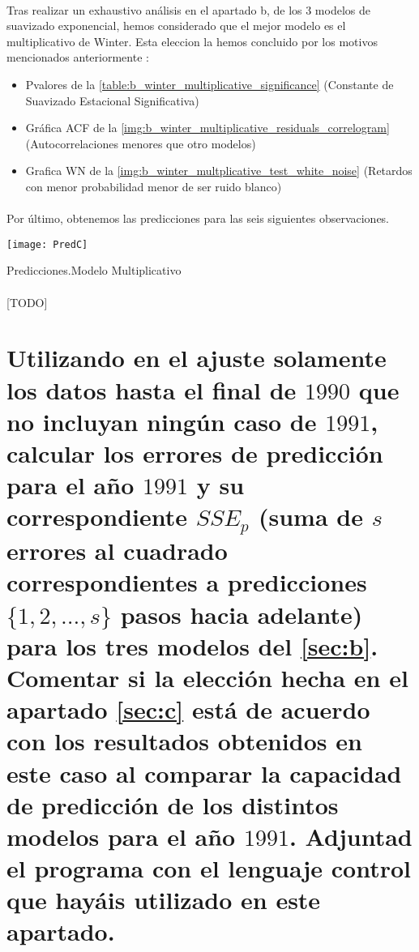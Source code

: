 \documentclass[a4paper, spanish]{article}
\begin{document}
    \paragraph{}
    Tras realizar un exhaustivo análisis en el apartado b, de los 3 modelos de suavizado exponencial, hemos considerado que el mejor modelo es el multiplicativo de Winter.
    Esta eleccion la hemos concluido por los motivos mencionados anteriormente :

    \begin{itemize}
      \item Pvalores de la \autoref{table:b_winter_multiplicative_significance} (Constante de Suavizado Estacional Significativa)
      \item Gráfica ACF de la \autoref{img:b_winter_multiplicative_residuals_correlogram} (Autocorrelaciones menores que otro modelos)
      \item Grafica WN de la \autoref{img:b_winter_multplicative_test_white_noise} (Retardos con menor probabilidad menor de ser ruido blanco)
    \end{itemize}

    \paragraph{}
    Por último, obtenemos las predicciones para las seis siguientes observaciones.

    \begin{table}[htb!]
      \centering
      \texttt{[image: PredC]}
      \caption{Predicciones.Modelo Multiplicativo}
      \label{}
    \end{table}

    \paragraph{}
    [TODO]

  \section{Utilizando en el ajuste solamente los datos hasta el final de $1990$ que no incluyan ningún caso de $1991$, calcular los errores de predicción para el año $1991$ y su correspondiente $SSE_p$ (suma de $s$ errores al cuadrado correspondientes a predicciones $\{1, 2, ..., s\}$ pasos hacia adelante) para los tres modelos del \autoref{sec:b}. Comentar si la elección hecha en el apartado \autoref{sec:c} está de acuerdo con los resultados obtenidos en este caso al comparar la capacidad de predicción de los distintos modelos para el año $1991$. Adjuntad el programa con el lenguaje control que hayáis utilizado en este apartado.}
  \label{sec:d}
\end{document}
